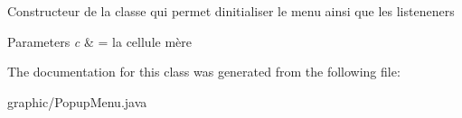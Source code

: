 Constructeur de la classe qui permet d\textquotesingle{}initialiser le menu ainsi que les listeneners 
\begin{DoxyParams}{Parameters}
{\em c} & = la cellule mère \\
\hline
\end{DoxyParams}


The documentation for this class was generated from the following file\+:\begin{DoxyCompactItemize}
\item 
graphic/Popup\+Menu.\+java\end{DoxyCompactItemize}
